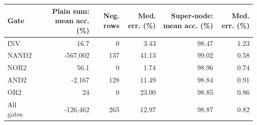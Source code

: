 \begin{tabular}{lrrrrr}
\toprule
Gate & Plain sum: mean acc. (\%) & Neg. rows & Med. err. (\%) & Super-node: mean acc. (\%) & Med. err. (\%) \\
\midrule
INV & 16.7 & 0 & 3.43 & 98.47 & 1.23 \\
NAND2 & -567,002 & 137 & 41.13 & 99.02 & 0.58 \\
NOR2 & 56.1 & 0 & 1.74 & 98.96 & 0.74 \\
AND2 & -2,167 & 128 & 11.49 & 98.84 & 0.91 \\
OR2 & 24 & 0 & 23.00 & 98.85 & 0.86 \\
\midrule
All gates & -126,462 & 265 & 12.97 & 98.87 & 0.82 \\
\bottomrule
\end{tabular}

